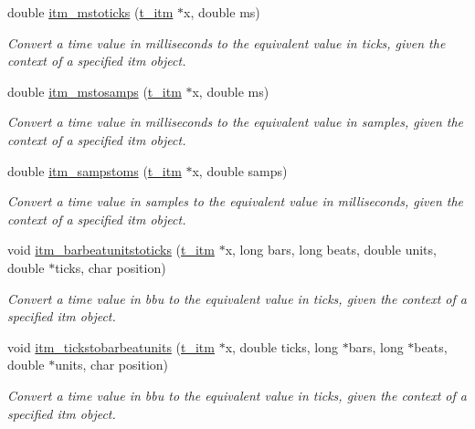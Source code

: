 \begin{DoxyCompactItemize}
double \hyperlink{group__time_gab32518269a1b30459b72e215567697ad}{itm\_\-mstoticks} (\hyperlink{group__time_gac656fa1f920c69cf77e6631bcec53077}{t\_\-itm} $\ast$x, double ms)
\begin{DoxyCompactList}\small\item\em Convert a time value in milliseconds to the equivalent value in ticks, given the context of a specified itm object. \item\end{DoxyCompactList}\item 
double \hyperlink{group__time_gaa131b77f55df783dda39c2a97c7af440}{itm\_\-mstosamps} (\hyperlink{group__time_gac656fa1f920c69cf77e6631bcec53077}{t\_\-itm} $\ast$x, double ms)
\begin{DoxyCompactList}\small\item\em Convert a time value in milliseconds to the equivalent value in samples, given the context of a specified itm object. \item\end{DoxyCompactList}\item 
double \hyperlink{group__time_ga554348a51466458ca16a7c8101e16f44}{itm\_\-sampstoms} (\hyperlink{group__time_gac656fa1f920c69cf77e6631bcec53077}{t\_\-itm} $\ast$x, double samps)
\begin{DoxyCompactList}\small\item\em Convert a time value in samples to the equivalent value in milliseconds, given the context of a specified itm object. \item\end{DoxyCompactList}\item 
void \hyperlink{group__time_gadca2e82e0cadd3bacd75aa6a137ac530}{itm\_\-barbeatunitstoticks} (\hyperlink{group__time_gac656fa1f920c69cf77e6631bcec53077}{t\_\-itm} $\ast$x, long bars, long beats, double units, double $\ast$ticks, char position)
\begin{DoxyCompactList}\small\item\em Convert a time value in bbu to the equivalent value in ticks, given the context of a specified itm object. \item\end{DoxyCompactList}\item 
void \hyperlink{group__time_ga098ba18a9c4a10c3d92445b0bf3da025}{itm\_\-tickstobarbeatunits} (\hyperlink{group__time_gac656fa1f920c69cf77e6631bcec53077}{t\_\-itm} $\ast$x, double ticks, long $\ast$bars, long $\ast$beats, double $\ast$units, char position)
\begin{DoxyCompactList}\small\item\em Convert a time value in bbu to the equivalent value in ticks, given the context of a specified itm object. \item\end{DoxyCompactList}\item 

\end{DoxyCompactItemize}
